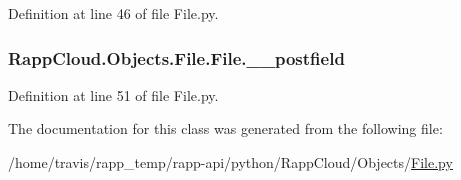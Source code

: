 Definition at line 46 of file File.\-py.

\hypertarget{classRappCloud_1_1Objects_1_1File_1_1File_a9dad89eaa829822fa961f0513c7bbd59}{
\subsubsection[{\-\_\-\-\_\-postfield}]{\setlength{\rightskip}{0pt plus 5cm}Rapp\-Cloud.\-Objects.\-File.\-File.\-\_\-\-\_\-postfield\hspace{0.3cm}{\ttfamily [private]}}}\label{classRappCloud_1_1Objects_1_1File_1_1File_a9dad89eaa829822fa961f0513c7bbd59}


Definition at line 51 of file File.\-py.



The documentation for this class was generated from the following file\-:\begin{DoxyCompactItemize}
\item 
/home/travis/rapp\-\_\-temp/rapp-\/api/python/\-Rapp\-Cloud/\-Objects/\hyperlink{File_8py}{File.\-py}\end{DoxyCompactItemize}
